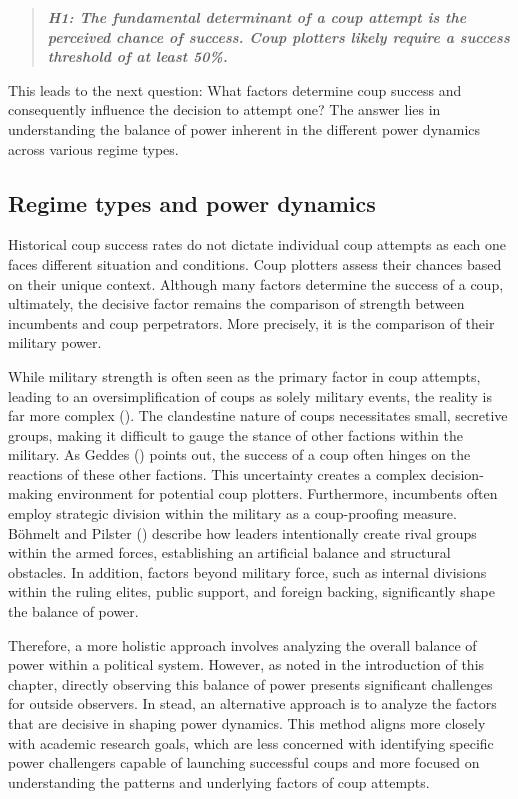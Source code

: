 \documentclass[
  12pt,
]{report}
\begin{document}
\begin{quote}
\textbf{\emph{H1: The fundamental determinant of a coup attempt is the
perceived chance of success. Coup plotters likely require a success
threshold of at least 50\%.}}
\end{quote}

This leads to the next question: What factors determine coup success and
consequently influence the decision to attempt one? The answer lies in
understanding the balance of power inherent in the different power
dynamics across various regime types.

\subsection{Regime types and power
dynamics}\label{regime-types-and-power-dynamics}

Historical coup success rates do not dictate individual coup attempts as
each one faces different situation and conditions. Coup plotters assess
their chances based on their unique context. Although many factors
determine the success of a coup, ultimately, the decisive factor remains
the comparison of strength between incumbents and coup perpetrators.
More precisely, it is the comparison of their military power.

While military strength is often seen as the primary factor in coup
attempts, leading to an oversimplification of coups as solely military
events, the reality is far more complex (). The clandestine nature of coups necessitates small, secretive
groups, making it difficult to gauge the stance of other factions within
the military. As Geddes () points out,
the success of a coup often hinges on the reactions of these other
factions. This uncertainty creates a complex decision-making environment
for potential coup plotters. Furthermore, incumbents often employ
strategic division within the military as a coup-proofing measure.
Böhmelt and Pilster () describe how
leaders intentionally create rival groups within the armed forces,
establishing an artificial balance and structural obstacles. In
addition, factors beyond military force, such as internal divisions
within the ruling elites, public support, and foreign backing,
significantly shape the balance of power.

Therefore, a more holistic approach involves analyzing the overall
balance of power within a political system. However, as noted in the
introduction of this chapter, directly observing this balance of power
presents significant challenges for outside observers. In stead, an
alternative approach is to analyze the factors that are decisive in
shaping power dynamics. This method aligns more closely with academic
research goals, which are less concerned with identifying specific power
challengers capable of launching successful coups and more focused on
understanding the patterns and underlying factors of coup attempts.
\end{document}
